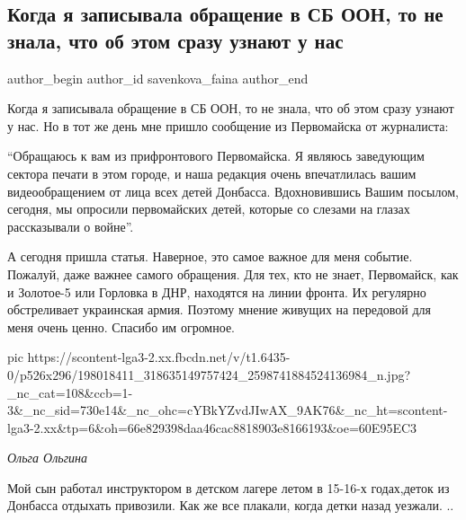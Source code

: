  
 
 
 
 
 
\subsection{Когда я записывала обращение в СБ ООН, то не знала, что об этом сразу узнают у нас}
\label{sec:10_06_2021.fb.savenkova_faina.1.obraschenie_v_oon_video_donbass_deti}
\ifcmt
 author_begin
   author_id savenkova_faina
 author_end
\fi

Когда я записывала обращение в СБ ООН, то не знала, что об этом сразу узнают у
нас. Но в тот же день мне пришло сообщение из Первомайска от журналиста:

\enquote{Обращаюсь к вам из прифронтового Первомайска. Я являюсь заведующим
сектора печати в этом городе, и наша редакция очень впечатлилась вашим
видеообращением от лица всех детей Донбасса. Вдохновившись Вашим посылом,
сегодня, мы опросили первомайских детей, которые со слезами на глазах
рассказывали о войне}.

А сегодня пришла статья. Наверное, это самое важное для меня событие. Пожалуй,
даже важнее самого обращения. Для тех, кто не знает, Первомайск, как и
Золотое-5 или Горловка в ДНР, находятся на линии фронта. Их регулярно
обстреливает украинская армия. Поэтому мнение живущих на передовой для меня
очень ценно. Спасибо им огромное.

\ifcmt
  pic https://scontent-lga3-2.xx.fbcdn.net/v/t1.6435-0/p526x296/198018411_318635149757424_2598741884524136984_n.jpg?_nc_cat=108&ccb=1-3&_nc_sid=730e14&_nc_ohc=cYBkYZvdJIwAX_9AK76&_nc_ht=scontent-lga3-2.xx&tp=6&oh=66e829398daa46cac8818903e8166193&oe=60E95EC3
\fi

\emph{Ольга Ольгина}

Мой сын работал инструктором в детском лагере летом в 15-16-х годах,деток из
Донбасса отдыхать привозили. Как же все плакали, когда детки назад уезжали. ..
